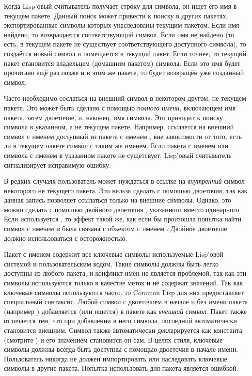 Когда Lisp'овый считыватель получает строку для символа, он ищет его имя в
текущем пакете.
Данный поиск может привести к поиску в других пакетах, экспортированные символы
которых унаследованы текущим пакетом. Если имя найдено, то возвращается
соответствующий символ. Если имя не найдено (то есть, в текущем пакете не
существует соответствующего доступного символа), то создаётся новый символ и
помещается в текущий пакет. Если точнее, то текущий пакет становится владельцем
(домашним пакетом) символа.
Если это имя будет прочитано ещё раз позже и в этом же пакете, то будет
возвращён уже созданный символ.

Часто необходимо сослаться на внешний символ в некотором другом, не текущем
пакете. Это может быть сделано с помощью \emph{полного имени}, включающем имя
пакета, затем двоеточие, и, наконец, имя символа. Это приводит к поиску символа
в указанном, а не текущем пакете. Например,  ссылается на
внешний символ с именем  доступный из пакета с именем ,
вне зависимости от того, есть ли в текущем пакете символ с таким же именем.
Если пакета с именем  или символа с именем  в указанном
пакете не сущетсвует, Lisp'овый считыватель сигнализирует исправимую ошибку.

В редких случаях пользователь может нуждаться в ссылке на \emph{внутренний}
символ некоторого не текущего пакета. Это нельзя сделать с помощью двоеточия,
так как данная запись позволяет ссылаться только на внешние символы. Однако, это
можно сделать с помощью двойного двоеточия \cd{::}, указанного вместо
одинарного. Если используется , то эффект такой же, как если
бы произошла попытка найти символ с именем  и  была
связана с объектом с именем . Двойное двоеточие должно использоваться
с осторожностью.

Пакет с именем  содержит все ключевые символы используемые
Lisp'овой системой и пользовательским кодом. Такие символы должны быть легко
доступны из любого пакета, и конфликт имён не является проблемой, так как эти
символы используются только в качестве меток и не содержат значений. Так как
ключевые символы используются часто, то Common Lisp для них предоставляет
специальный синтаксис. Любой символ с двоеточием в начале и без имени пакета
(например ) добавляется (или ищется) в пакете  как
\emph{внешний} символ. Пакет  также отличается тем, что при
добавлении в него символа, последний автоматически становится внешним. Символ
также автоматически декларируется как константа (смотрите ) и
его значением становится он сам.
В целях стиля, ключевые символы должны всегда быть доступны с помощью двоеточия
в начале имени. Пользователь никогда не должен импортировать или наследовать
ключевые символы в другие пакета. Попытка использовать  для
 пакета является ошибкой.

